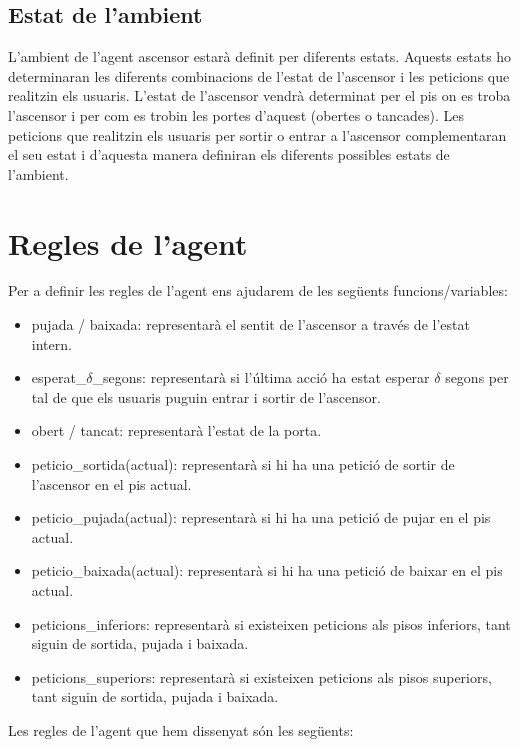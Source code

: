 \documentclass[a4paper, 11pt]{article}
\begin{document}
\subsection{Estat de l'ambient}

L'ambient de l'agent ascensor estarà definit per diferents estats. Aquests
estats ho determinaran les diferents combinacions de l'estat de l'ascensor i
les peticions que realitzin els usuaris. L'estat de l'ascensor vendrà
determinat per el pis on es troba l'ascensor i per com es trobin les portes
d'aquest (obertes o tancades). Les peticions que realitzin els usuaris per
sortir o entrar a l'ascensor complementaran el seu estat i d'aquesta manera
definiran els diferents possibles estats de l'ambient.

\section{Regles de l'agent}

Per a definir les regles de l'agent ens ajudarem de les següents funcions/variables:
\begin{itemize}
\item pujada / baixada: representarà el sentit de l'ascensor a través de l'estat intern.
\item esperat\_$\delta$\_segons: representarà si l'última acció ha estat esperar $\delta$ segons per tal de que els usuaris puguin entrar i sortir de l'ascensor.
\item obert / tancat: representarà l'estat de la porta.
\item peticio\_sortida(actual): representarà si hi ha una petició de sortir de l'ascensor en el pis actual.
\item peticio\_pujada(actual): representarà si hi ha una petició de pujar en el pis actual.
\item peticio\_baixada(actual): representarà si hi ha una petició de baixar en el pis actual.
\item peticions\_inferiors: representarà si existeixen peticions als pisos inferiors, tant siguin de sortida, pujada i baixada.
\item peticions\_superiors: representarà si existeixen peticions als pisos superiors, tant siguin de sortida, pujada i baixada.
\end{itemize}

Les regles de l'agent que hem dissenyat són les següents:
\end{document}
